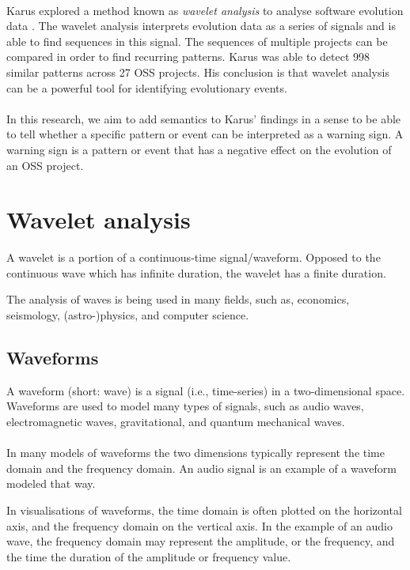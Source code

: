 \paragraph{}
Karus explored a method known as \emph{wavelet analysis }\rm to analyse software
evolution data \cite{karus2013}. The wavelet analysis interprets evolution data
as a series of signals and is able to find sequences in this signal. The
sequences of multiple projects can be compared in order to find recurring
patterns. Karus was able to detect 998 similar patterns across 27 OSS projects.
His conclusion is that wavelet analysis can be a powerful tool for identifying
evolutionary events.

\paragraph{}
In this research, we aim to add semantics to Karus' findings in a sense to be
able to tell whether a specific pattern or event can be interpreted as a
warning sign. A warning sign is a pattern or event that has a negative effect
on the evolution of an OSS project.

\section{Wavelet analysis}
A wavelet is a portion of a continuous-time signal/waveform. Opposed to the
continuous wave which has infinite duration, the wavelet has a finite duration.

The analysis of waves is being used in many fields, such as, economics,
seismology, (astro-)physics, and computer science.

\subsection{Waveforms}
A waveform (short: wave) is a signal (i.e., time-series) in a two-dimensional
space. Waveforms are used to model many types of signals, such as audio waves,
electromagnetic waves, gravitational, and quantum mechanical waves.

\paragraph{}
In many models of waveforms the two dimensions typically represent the time
domain and the frequency domain. An audio signal is an example of a waveform
modeled that way.

In visualisations of waveforms, the time domain is often plotted on the
horizontal axis, and the frequency domain on the vertical axis. In the example
of an audio wave, the frequency domain may represent the amplitude, or the
frequency, and the time the duration of the amplitude or frequency value.

